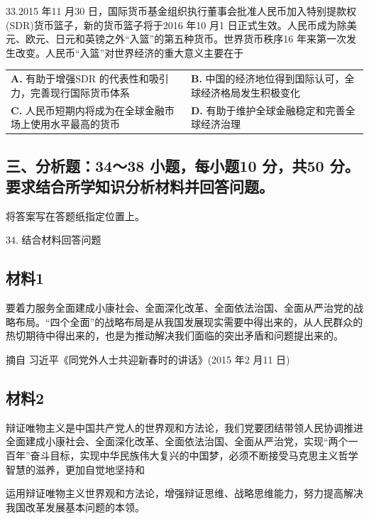 \documentclass[UTF8,11pt]{ctexart}
\begin{document}
33.2015 年11 月30 日，国际货币基金组织执行董事会批准人民币加入特别提款权(SDR)货币篮子，新的货币篮子将于2016 年10 月1 日正式生效。人民币成为除美元、欧元、日元和英镑之外“入篮”的第五种货币。世界货币秩序16 年来第一次发生改变。人民币“入篮”对世界经济的重大意义主要在于


\begin{center}\begin{tabular}{>{\raggedright\arraybackslash}p{\dimexpr(\linewidth-4\tabcolsep)/2\relax}>{\raggedright\arraybackslash}p{\dimexpr(\linewidth-4\tabcolsep)/2\relax}}
\textbf{A.} 有助于增强SDR 的代表性和吸引力，完善现行国际货币体系 & \textbf{B.} 中国的经济地位得到国际认可，全球经济格局发生积极变化\\[.35em]
\textbf{C.} 人民币短期内将成为在全球金融市场上使用水平最高的货币 & \textbf{D.} 有助于维护全球金融稳定和完善全球经济治理\\[.35em]\end{tabular}\end{center}

\subsection*{三、分析题：34～38 小题，每小题10 分，共50 分。要求结合所学知识分析材料并回答问题。}

将答案写在答题纸指定位置上。


34. 结合材料回答问题


\subsection*{材料1}

要着力服务全面建成小康社会、全面深化改革、全面依法治国、全面从严治党的战略布局。“四个全面”的战略布局是从我国发展现实需要中得出来的，从人民群众的热切期待中得出来的，也是为推动解决我们面临的突出矛盾和问题提出来的。

摘自 习近平《同党外人士共迎新春时的讲话》(2015 年2 月11 日)

\subsection*{材料2}

辩证唯物主义是中国共产党人的世界观和方法论，我们党要团结带领人民协调推进全面建成小康社会、全面深化改革、全面依法治国、全面从严治党，实现“两个一百年”奋斗目标，实现中华民族伟大复兴的中国梦，必须不断接受马克思主义哲学智慧的滋养，更加自觉地坚持和


运用辩证唯物主义世界观和方法论，增强辩证思维、战略思维能力，努力提高解决我国改革发展基本问题的本领。
\end{document}
